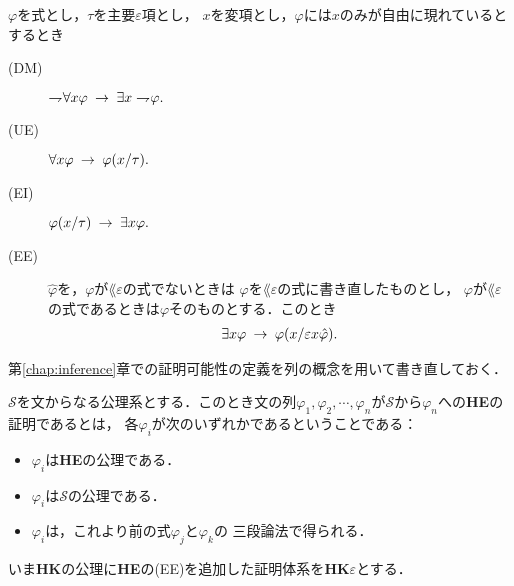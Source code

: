 	\begin{screen}
		\begin{logicalaxm}[{\bf HE}の公理(量化)]
			$\varphi$を式とし，$\tau$を主要$\varepsilon$項とし，
			$x$を変項とし，$\varphi$には$x$のみが自由に現れているとするとき
			\begin{description}
				\item[(DM)] $\rightharpoondown\hspace{-0.25em} \forall x \varphi
					\hspace{0.25em}\rightarrow\hspace{0.25em} \exists x \rightharpoondown\hspace{-0.25em} \varphi.$
				
				\item[(UE)] $\forall x \varphi \hspace{0.25em}\rightarrow\hspace{0.25em} \varphi(x/\tau).$
				
				\item[(EI)] $\varphi(x/\tau) \hspace{0.25em}\rightarrow\hspace{0.25em} \exists x \varphi.$
				
				\item[(EE)] $\hat{\varphi}$を，$\varphi$が$\lang{\varepsilon}$の式でないときは
					$\varphi$を$\lang{\varepsilon}$の式に書き直したものとし，
					$\varphi$が$\lang{\varepsilon}$の式であるときは$\varphi$そのものとする．このとき
					\begin{align}
						\exists x \varphi \hspace{0.25em}\rightarrow\hspace{0.25em} \varphi(x/\varepsilon x \hat{\varphi}).
					\end{align}
			\end{description}
		\end{logicalaxm}
	\end{screen}
	
	第\ref{chap:inference}章での証明可能性の定義を列の概念を用いて書き直しておく．
	
	\begin{screen}
		\begin{metadfn}[{\bf HE}における証明]
			$\mathscr{S}$を文からなる公理系とする．このとき文の列$\varphi_{1},\varphi_{2},\cdots,
			\varphi_{n}$が$\mathscr{S}$から$\varphi_{n}$への{\bf HE}の証明であるとは，
			各$\varphi_{i}$が次のいずれかであるということである：
			\begin{itemize}
				\item $\varphi_{i}$は{\bf HE}の公理である．
				\item $\varphi_{i}$は$\mathscr{S}$の公理である．
				\item $\varphi_{i}$は，これより前の式$\varphi_{j}$と$\varphi_{k}$の
					三段論法で得られる．
			\end{itemize}
		\end{metadfn}
	\end{screen}
	
	いま{\bf HK}の公理に{\bf HE}の(EE)を追加した証明体系を{\bf HK$\varepsilon$}とする．
	
